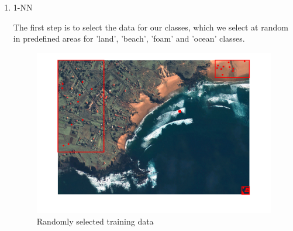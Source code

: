 \begin{enumerate}
    \item 1-NN 

    The first step is to select the data for our classes, which we select at random in predefined areas for 'land', 'beach', 'foam' and 'ocean' classes.
    \begin{figure}[!ht]
        \centering
        \includegraphics[width=0.45\linewidth]{Doc/Graphics/Part4/kNN_training_sets.png}
        \caption{Randomly selected training data}
    \end{figure}


\end{enumerate}
